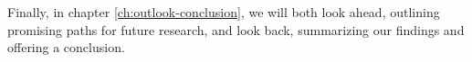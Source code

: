 Finally, in chapter \ref{ch:outlook-conclusion}, we will both look ahead, outlining promising paths for future research, and look back, summarizing our findings and offering a conclusion.

%
%
%
%
%
%
%

